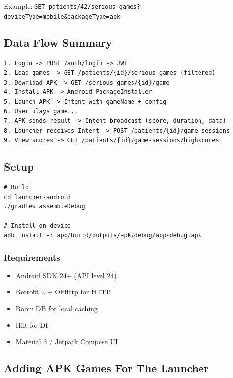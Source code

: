 Example:
\texttt{GET\ patients/42/serious-games?deviceType=mobile\&packageType=apk}

\subsection{Data Flow Summary}\label{data-flow-summary}

\begin{verbatim}
1. Login -> POST /auth/login -> JWT
2. Load games -> GET /patients/{id}/serious-games (filtered)
3. Download APK -> GET /serious-games/{id}/game
4. Install APK -> Android PackageInstaller
5. Launch APK -> Intent with gameName + config
6. User plays game...
7. APK sends result -> Intent broadcast (score, duration, data)
8. Launcher receives Intent -> POST /patients/{id}/game-sessions
9. View scores -> GET /patients/{id}/game-sessions/highscores
\end{verbatim}

\subsection{Setup}\label{setup}

\begin{lstlisting}
# Build
cd launcher-android
./gradlew assembleDebug

# Install on device
adb install -r app/build/outputs/apk/debug/app-debug.apk
\end{lstlisting}

\subsubsection{Requirements}\label{requirements}

\begin{itemize}
\tightlist
\item
  Android SDK 24+ (API level 24)
\item
  Retrofit 2 + OkHttp for HTTP
\item
  Room DB for local caching
\item
  Hilt for DI
\item
  Material 3 / Jetpack Compose UI
\end{itemize}

\subsection{Adding APK Games For The
Launcher}\label{adding-apk-games-for-the-launcher}

